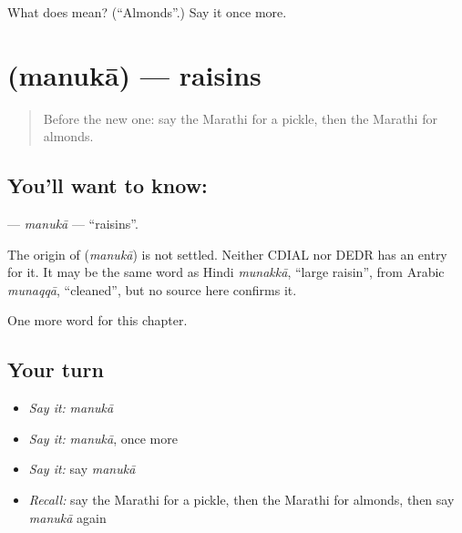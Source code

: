 \begin{tcolorbox}[breakable,colback=teal!4,colframe=teal!35!black,title={Before you move on}]
What does  mean? (\textquotedblleft{}Almonds\textquotedblright{}.) Say it once more.
\end{tcolorbox}
\section[\texorpdfstring{\mr{मनुका} (manukā)}{मनुका (manukā)}]{ (manukā) — raisins}

\label{lesson:MR-C270-manuka}



\begin{quote}
Before the new one: say the Marathi for a pickle, then the Marathi for almonds.
\end{quote}

\subsection*{You'll want to know: }
\textbf{} — \emph{manukā} — \textquotedblleft{}raisins\textquotedblright{}.

\begin{cousinweb}
The origin of \textbf{} (\emph{manukā}) is not settled. Neither CDIAL nor DEDR has an entry for it. It may be the same word as Hindi \emph{munakkā}, \textquotedblleft{}large raisin\textquotedblright{}, from Arabic \emph{munaqqā}, \textquotedblleft{}cleaned\textquotedblright{}, but no source here confirms it.
\end{cousinweb}

\begin{grammarlens}[title={What you've built}]
One more word for this chapter.
\end{grammarlens}

\subsection*{Your turn}
\begin{itemize}
\raggedright
  \item \emph{Say it:} \emph{manukā}
  \item \emph{Say it:} \emph{manukā}, once more
  \item \emph{Say it:} say \emph{manukā}
  \item \emph{Recall:} say the Marathi for a pickle, then the Marathi for almonds, then say \emph{manukā} again
\end{itemize}

